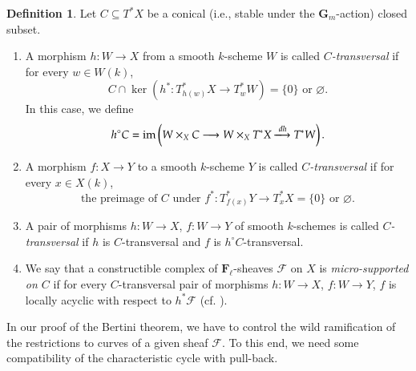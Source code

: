 \documentclass[twoside]{amsart}
\newcommand{\FF}{\mathbf{F}}
\newcommand{\Ff}{\mathscr{F}}
\newcommand{\xto}{\xlongrightarrow}
\renewcommand{\to}{\longrightarrow}
\theoremstyle{plain}
\theoremstyle{definition}
\newtheorem{definition}[subsubsection]{Definition}
\theoremstyle{remark}
\numberwithin{equation}{subsection}
\begin{document}
\begin{definition} \label{def:c-transversal} 
	Let $C\subseteq T^* X$ be a conical (i.e., stable under the $\mathbf{G}_m$-action) closed subset. 
	\begin{enumerate}
		\item A morphism $h\colon W\to X$ from a smooth $k$-scheme $W$ is called \emph{$C$-transversal} if for every $w\in W(k)$, 
		\[ 
			C \cap \ker\left(h^*\colon  T^*_{h(w)} X\to T^*_w W\right) = \{0\} \text{ or }\varnothing.
		\]
		In this case, we define 
		\[ 
			h^\circ C = {\rm im}\left( W\times_X C \to W\times_X T^* X \xto{dh} T^* W\right).
		\]
		\item A morphism $f\colon X\to Y$ to a smooth $k$-scheme $Y$ is called \emph{$C$-transversal} if for every $x\in X(k)$,
		\[ 
			\text{the preimage of }C\text{ under }f^*\colon T^*_{f(x)} Y \to T^*_x X = \{0\} \text{ or }\varnothing.
		\]
		\item A pair of morphisms $h\colon W\to X$, $f\colon W\to Y$ of smooth $k$-schemes is called \emph{$C$-transversal} if $h$ is $C$-transversal and $f$ is $h^\circ C$-transversal. 
		\item We say that a constructible complex of $\FF_\ell$-sheaves $\Ff$ on $X$ is \emph{micro-supported on $C$} if for every $C$-transversal pair of morphisms $h\colon W\to X$, $f\colon W\to Y$, $f$ is locally acyclic with respect to $h^* \Ff$ (cf. \cite[Th.Finitude, Definition~2.12]{ThFinitude}).
	\end{enumerate}
\end{definition}

In our proof of the Bertini theorem, we have to control the wild ramification of the restrictions to curves of a given sheaf $\Ff$. To this end, we need some compatibility of the characteristic cycle with pull-back. 
\end{document}
